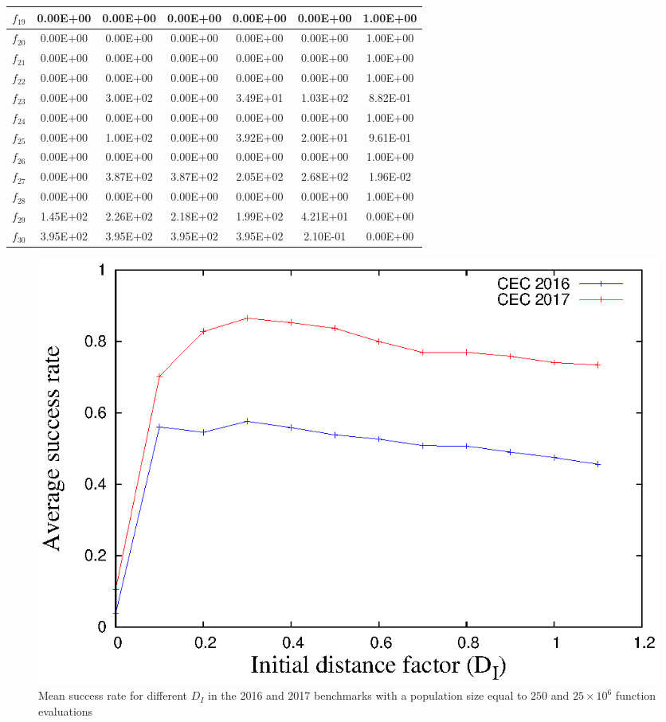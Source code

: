 \begin{table}[t]
\begin{scriptsize}
\begin{tabular}{|c|c|c|c|c|c|c|}
$f_{19}$ & 0.00E+00 & 0.00E+00 & 0.00E+00 & 0.00E+00 & 0.00E+00 & 1.00E+00 \\ \hline
$f_{20}$ & 0.00E+00 & 0.00E+00 & 0.00E+00 & 0.00E+00 & 0.00E+00 & 1.00E+00 \\ \hline
$f_{21}$ & 0.00E+00 & 0.00E+00 & 0.00E+00 & 0.00E+00 & 0.00E+00 & 1.00E+00 \\ \hline
$f_{22}$ & 0.00E+00 & 0.00E+00 & 0.00E+00 & 0.00E+00 & 0.00E+00 & 1.00E+00 \\ \hline
$f_{23}$ & 0.00E+00 & 3.00E+02 & 0.00E+00 & 3.49E+01 & 1.03E+02 & 8.82E-01 \\ \hline
$f_{24}$ & 0.00E+00 & 0.00E+00 & 0.00E+00 & 0.00E+00 & 0.00E+00 & 1.00E+00 \\ \hline
$f_{25}$ & 0.00E+00 & 1.00E+02 & 0.00E+00 & 3.92E+00 & 2.00E+01 & 9.61E-01 \\ \hline
$f_{26}$ & 0.00E+00 & 0.00E+00 & 0.00E+00 & 0.00E+00 & 0.00E+00 & 1.00E+00 \\ \hline
$f_{27}$ & 0.00E+00 & 3.87E+02 & 3.87E+02 & 2.05E+02 & 2.68E+02 & 1.96E-02 \\ \hline
$f_{28}$ & 0.00E+00 & 0.00E+00 & 0.00E+00 & 0.00E+00 & 0.00E+00 & 1.00E+00 \\ \hline
$f_{29}$ & 1.45E+02 & 2.26E+02 & 2.18E+02 & 1.99E+02 & 4.21E+01 & 0.00E+00 \\ \hline
$f_{30}$ & 3.95E+02 & 3.95E+02 & 3.95E+02 & 3.95E+02 & 2.10E-01 & 0.00E+00 \\ \hline
\end{tabular}%
\end{scriptsize}
\end{table}

\begin{figure}[t]
\centering
  \includegraphics[scale=0.6]{img/Tuning_CEC.eps}
\caption{Mean success rate for different $D_I$ in the \CEC{} 2016 and \CEC{} 2017 benchmarks with a population size equal to $250$ and $25 \times 10^6$ function evaluations}
\label{fig:one}
\end{figure}

